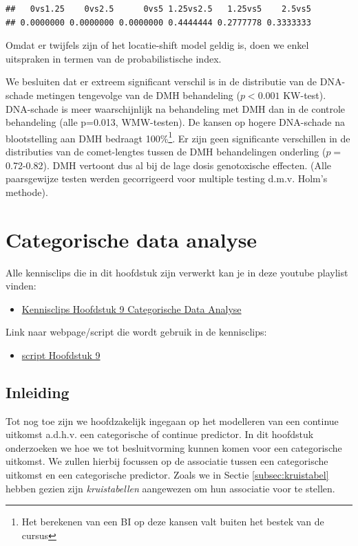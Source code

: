 \documentclass[
  12pt,dutch]{book}
\providecommand{\tightlist}{%
  \setlength{\itemsep}{0pt}\setlength{\parskip}{0pt}}
\theoremstyle{definition}
\theoremstyle{definition}
\theoremstyle{definition}
\theoremstyle{definition}
\theoremstyle{remark}
\begin{document}
\begin{verbatim}
##   0vs1.25    0vs2.5      0vs5 1.25vs2.5   1.25vs5    2.5vs5 
## 0.0000000 0.0000000 0.0000000 0.4444444 0.2777778 0.3333333
\end{verbatim}

Omdat er twijfels zijn of het locatie-shift model geldig is, doen we enkel uitspraken in termen van de probabilistische index.

We besluiten dat er extreem significant verschil is in de distributie van de DNA-schade metingen tengevolge van de DMH behandeling (\(p<0.001\) KW-test).
DNA-schade is meer waarschijnlijk na behandeling met DMH dan in de controle behandeling (alle p=0.013, WMW-testen).
De kansen op hogere DNA-schade na blootstelling aan DMH bedraagt 100\%\footnote{Het berekenen van een BI op deze kansen valt buiten het bestek van de cursus}.
Er zijn geen significante verschillen in de distributies van de comet-lengtes tussen de DMH behandelingen onderling (\(p=\) 0.72-0.82). DMH vertoont dus al bij de lage dosis genotoxische effecten. (Alle paarsgewijze testen werden gecorrigeerd voor multiple testing d.m.v. Holm's methode).

\chapter{Categorische data analyse}\label{chap-categorisch}

Alle kennisclips die in dit hoofdstuk zijn verwerkt kan je in deze youtube playlist vinden:

\begin{itemize}
\tightlist
\item
  \href{https://www.youtube.com/playlist?list=PLZH1hP8_LbJJnNyz6IMPqq6fCMZJ63y8x}{Kennisclips Hoofdstuk 9 Categorische Data Analyse}
\end{itemize}

Link naar webpage/script die wordt gebruik in de kennisclips:

\begin{itemize}
\tightlist
\item
  \href{https://statomics.github.io/sbc/rmd/09-categoricalDataAnalysis.html}{script Hoofdstuk 9}
\end{itemize}

\section{Inleiding}\label{inleiding-8}

Tot nog toe zijn we hoofdzakelijk ingegaan op het modelleren van een continue uitkomst a.d.h.v. een categorische of continue predictor.
In dit hoofdstuk onderzoeken we hoe we tot besluitvorming kunnen komen voor een categorische uitkomst.
We zullen hierbij focussen op de associatie tussen een categorische uitkomst en een categorische predictor.
Zoals we in Sectie \ref{subsec:kruistabel} hebben gezien zijn \emph{kruistabellen} aangewezen om hun associatie voor te stellen.
\end{document}
